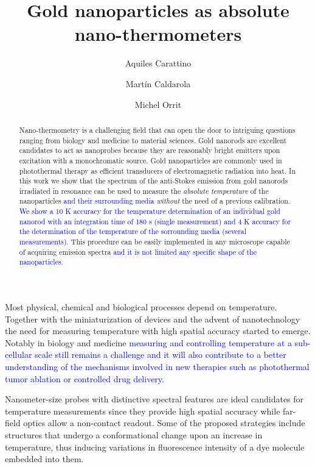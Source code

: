 \documentclass[journal=nalefd,manuscript=letter]{achemso}
\author{Aquiles Carattino}
\affiliation[Leiden]
{Huygens-Kamerlingh Onnes Lab, 2300RA Leiden, The Netherlands}
\author{Mart\'in Caldarola}
\affiliation[Leiden]
{Huygens-Kamerlingh Onnes Lab, 2300RA Leiden, The Netherlands}
\author{Michel Orrit}
\affiliation[Leiden]
{Huygens-Kamerlingh Onnes Lab, 2300RA Leiden, The Netherlands}
\title{Gold nanoparticles as absolute nano-thermometers}
\newcommand{\HI}[1]{\textcolor{blue}{#1}} %
\begin{document}
\maketitle

\begin{abstract}
Nano-thermometry is a challenging field that can open the door
to intriguing questions ranging from biology and medicine to material sciences.
Gold nanorods are excellent candidates to act as nanoprobes because they are
reasonably bright emitters upon excitation with a monochromatic source.
Gold nanoparticles are commonly used in photothermal therapy as efficient
transducers of electromagnetic radiation into heat. In this work we show that
the spectrum of the anti-Stokes emission from gold nanorods irradiated in
resonance can be used to measure the \textit{absolute temperature} of the nanoparticles \HI{and their
surrounding media} \textit{without} the need of a previous calibration. 
\HI{We show a $10$ K  accuracy for the temperature determination of an individual gold nanorod 
with an integration time of 180 s (single measurement) and $4$ K accuracy for the determination
of the temperature of the sorrounding media (several measurements).}
This procedure can be easily implemented in any microscope capable of acquiring emission spectra \HI{and it
is not limited any specific shape of the nanoparticles.} 

\end{abstract}


Most physical, chemical and biological processes depend on
temperature. Together with the miniaturization of devices and the advent of
nanotechnology the need for measuring temperature with high spatial accuracy
started to emerge. Notably in biology\cite{Yang2011a,Hrelescu2010} and
medicine\cite{Li2013c} \HI{measuring and controlling temperature at a sub-cellular scale
still remains a challenge and it will 
also contribute to a better understanding of the mechanisms involved in
new therapies such as photothermal tumor ablation\cite{Gobin2007} or controlled
drug delivery\cite{Huang2006,Huo2014}.}

Nanometer-size probes with distinctive spectral features are ideal candidates
for temperature measurements since they provide high spatial accuracy while
far-field optics allow a non-contact readout. Some of the proposed strategies
include structures that undergo a conformational change upon an increase in
temperature\cite{Ebrahimi2014}, thus inducing variations in fluorescence
intensity of a dye molecule embedded into them.
\end{document}
